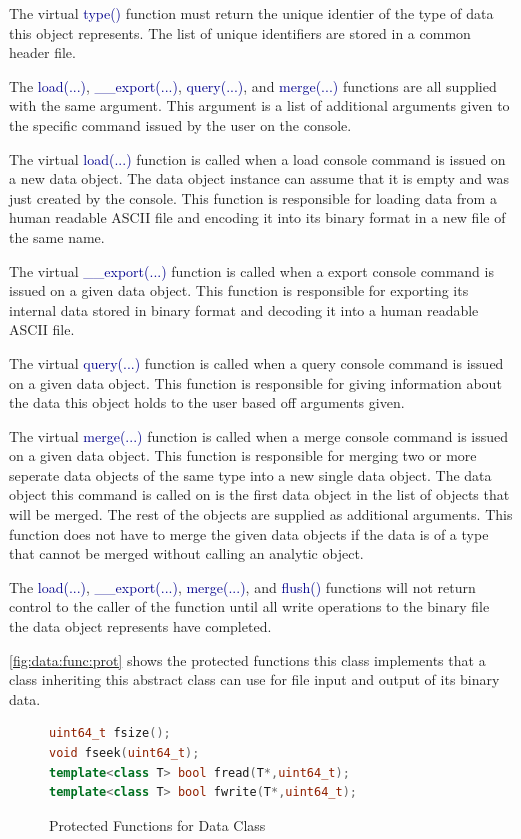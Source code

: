 \documentclass[10pt]{article}
\providecommand{\h}[1]{\textcolor{darkblue}{#1}}
\begin{document}
The virtual \h{type()} function must return the unique identier of the type of 
data this object represents. The list of unique identifiers are stored in a 
common header file.

The \h{load(...)}, \h{\_\_export(...)}, \h{query(...)}, and \h{merge(...)} 
functions are all supplied with the same argument. This argument is a list of 
additional arguments given to the specific command issued by the user on the 
console.

The virtual \h{load(...)} function is called when a load console command 
is issued on a new data object. The data object instance can assume that it is 
empty and was just created by the console. This function is responsible for 
loading data from a human readable ASCII file and encoding it into its binary 
format in a new file of the same name.

The virtual \h{\_\_export(...)} function is called when a export console command 
is issued on a given data object. This function is responsible for exporting 
its internal data stored in binary format and decoding it into a human readable 
ASCII file.

The virtual \h{query(...)} function is called when a query console command is 
issued on a given data object. This function is responsible for giving 
information about the data this object holds to the user based off arguments 
given.

The virtual \h{merge(...)} function is called when a merge console command is 
issued on a given data object. This function is responsible for merging two or 
more seperate data objects of the same type into a new single data object. The 
data object this command is called on is the first data object in the list of 
objects that will be merged. The rest of the objects are supplied as additional 
arguments. This function does not have to merge the given data objects if the 
data is of a type that cannot be merged without calling an analytic object.

The \h{load(...)}, \h{\_\_export(...)}, \h{merge(...)}, and \h{flush()} 
functions will not return control to the caller of the function until all write 
operations to the binary file the data object represents have completed.

\autoref{fig:data:func:prot} shows the protected functions this class 
implements that a class inheriting this abstract class can use for file input 
and output of its binary data.

\begin{figure}[H]
\begin{mdframed}[style=functions]
\begin{lstlisting}[language=C++]
uint64_t fsize();
void fseek(uint64_t);
template<class T> bool fread(T*,uint64_t);
template<class T> bool fwrite(T*,uint64_t);
\end{lstlisting}
\end{mdframed}
\caption{Protected Functions for Data Class}
\label{fig:data:func:prot}
\end{figure}
\end{document}

